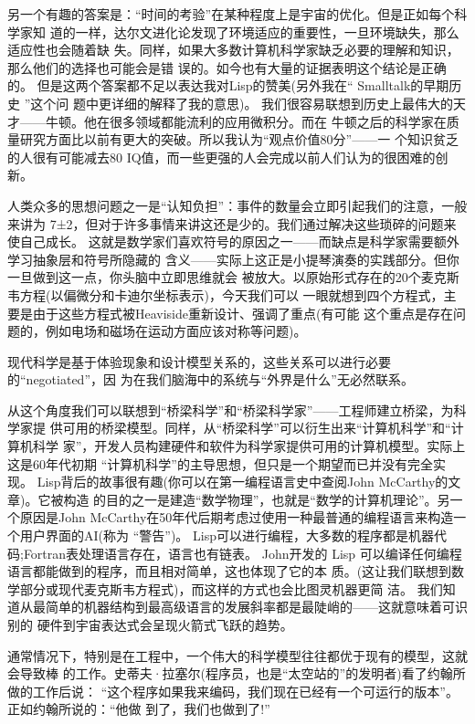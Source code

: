 \documentclass[11pt]{ctexart}
\begin{document}
另一个有趣的答案是：“时间的考验”在某种程度上是宇宙的优化。但是正如每个科学家知
道的一样，达尔文进化论发现了环境适应的重要性，一旦环境缺失，那么适应性也会随着缺
失。同样，如果大多数计算机科学家缺乏必要的理解和知识，那么他们的选择也可能会是错
误的。如今也有大量的证据表明这个结论是正确的。
但是这两个答案都不足以表达我对Lisp的赞美(另外我在“ Smalltalk的早期历史 ”这个问
题中更详细的解释了我的意思)。
我们很容易联想到历史上最伟大的天才——牛顿。他在很多领域都能流利的应用微积分。而在
牛顿之后的科学家在质量研究方面比以前有更大的突破。所以我认为“观点价值80分”——一
个知识贫乏的人很有可能减去80 IQ值，而一些更强的人会完成以前人们认为的很困难的创
新。

人类众多的思想问题之一是“认知负担”：事件的数量会立即引起我们的注意，一般来讲为
7±2，但对于许多事情来讲这还是少的。我们通过解决这些琐碎的问题来使自己成长。
这就是数学家们喜欢符号的原因之一——而缺点是科学家需要额外学习抽象层和符号所隐藏的
含义——实际上这正是小提琴演奏的实践部分。但你一旦做到这一点，你头脑中立即思维就会
被放大。以原始形式存在的20个麦克斯韦方程(以偏微分和卡迪尔坐标表示)，今天我们可以
一眼就想到四个方程式，主要是由于这些方程式被Heaviside重新设计、强调了重点(有可能
这个重点是存在问题的，例如电场和磁场在运动方面应该对称等问题)。

现代科学是基于体验现象和设计模型关系的，这些关系可以进行必要的“negotiated”，因
为在我们脑海中的系统与“外界是什么”无必然联系。

从这个角度我们可以联想到“桥梁科学”和“桥梁科学家”——工程师建立桥梁，为科学家提
供可用的桥梁模型。同样，从“桥梁科学”可以衍生出来“计算机科学”和“计算机科学
家”，开发人员构建硬件和软件为科学家提供可用的计算机模型。实际上这是60年代初期
“计算机科学”的主导思想，但只是一个期望而已并没有完全实现。
Lisp背后的故事很有趣(你可以在第一编程语言史中查阅John McCarthy的文章)。它被构造
的目的之一是建造“数学物理”，也就是“数学的计算机理论”。另一个原因是John
McCarthy在50年代后期考虑过使用一种最普通的编程语言来构造一个用户界面的AI(称为
“警告”)。
Lisp可以进行编程，大多数的程序都是机器代码;Fortran表处理语言存在，语言也有链表。
John开发的 Lisp 可以编译任何编程语言都能做到的程序，而且相对简单，这也体现了它的本
质。(这让我们联想到数学部分或现代麦克斯韦方程式)，而这样的方式也会比图灵机器更简
洁。
我们知道从最简单的机器结构到最高级语言的发展斜率都是最陡峭的——这就意味着可识别的
硬件到宇宙表达式会呈现火箭式飞跃的趋势。

通常情况下，特别是在工程中，一个伟大的科学模型往往都优于现有的模型，这就会导致棒
的工作。史蒂夫·拉塞尔(程序员，也是“太空站的”的发明者)看了约翰所做的工作后说：
“这个程序如果我来编码，我们现在已经有一个可运行的版本”。正如约翰所说的：“他做
到了，我们也做到了!”
\end{document}
